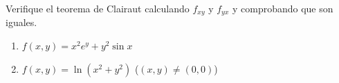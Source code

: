 Verifique el teorema de Clairaut calculando $f_{xy}$ y $f_{yx}$ y comprobando que son iguales.
\begin{enumerate}
    \item $f(x, y) = x^2 e^y + y^2 \sin x$
    \item $f(x, y) = \ln(x^2 + y^2)$ \quad ($(x,y) \neq (0,0)$)
\end{enumerate}
